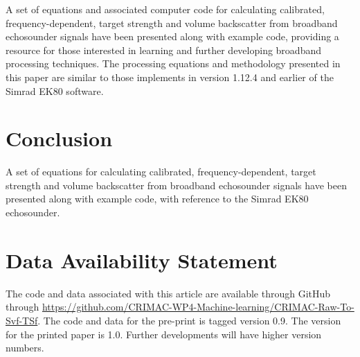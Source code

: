 \documentclass[preprint,12pt,TurnOnLineNumbers]{JASAnew}
\newcommand{\ek}{Simrad EK80}
\begin{document}
A set of equations and associated computer code for calculating calibrated, frequency-dependent, target strength and volume backscatter from broadband echosounder signals have been presented along with example code, providing a resource for those interested in learning and further developing broadband processing techniques. The processing equations and methodology presented in this paper are similar to those implements in version 1.12.4 and earlier of the \ek{} software.

\section{Conclusion}

A set of equations for calculating calibrated, frequency-dependent, target strength and volume backscatter from broadband echosounder signals have been presented along with example code, with reference to the \ek{} echosounder.

\section{Data Availability Statement}

The code and data associated with this article are available through GitHub through \url{https://github.com/CRIMAC-WP4-Machine-learning/CRIMAC-Raw-To-Svf-TSf}. The code and data for the pre-print is tagged version 0.9. The version for the printed paper is 1.0. Further developments will have higher version numbers.


\end{document}

